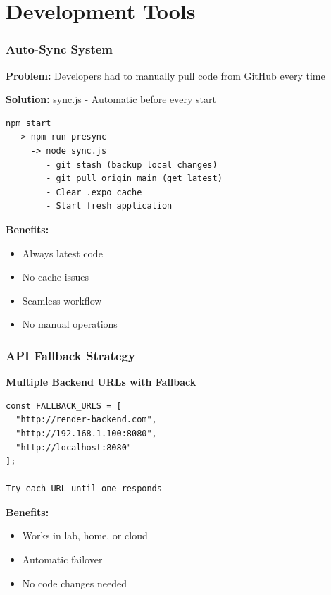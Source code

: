 \documentclass[11pt]{beamer}
\begin{document}
\section{Development Tools}

\begin{frame}
\frametitle{Auto-Sync System}
\textbf{Problem:} Developers had to manually pull code from GitHub every time

\vspace{0.5cm}
\textbf{Solution:} sync.js - Automatic before every start

\begin{lstlisting}
npm start
  -> npm run presync
     -> node sync.js
        - git stash (backup local changes)
        - git pull origin main (get latest)
        - Clear .expo cache
        - Start fresh application
\end{lstlisting}

\vspace{1cm}
\textbf{Benefits:}
\begin{itemize}
    \item Always latest code
    \item No cache issues
    \item Seamless workflow
    \item No manual operations
\end{itemize}
\end{frame}

\begin{frame}
\frametitle{API Fallback Strategy}
\textbf{Multiple Backend URLs with Fallback}

\begin{lstlisting}
const FALLBACK_URLS = [
  "http://render-backend.com",
  "http://192.168.1.100:8080",
  "http://localhost:8080"
];

Try each URL until one responds
\end{lstlisting}

\vspace{1cm}
\textbf{Benefits:}
\begin{itemize}
    \item Works in lab, home, or cloud
    \item Automatic failover
    \item No code changes needed
\end{itemize}
\end{frame}
\end{document}
